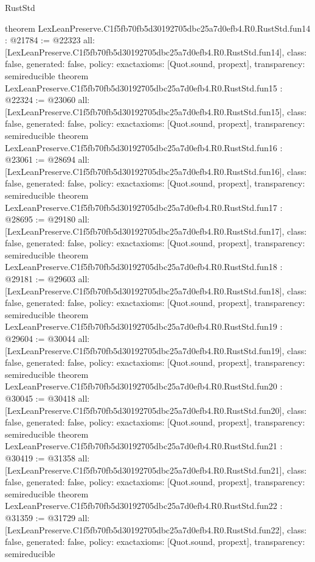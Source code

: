 \begin{lexlean}{RustStd}
\begin{coremodule}
{}
theorem LexLeanPreserve.C1f5fb70fb5d30192705dbc25a7d0efb4.R0.RustStd.fun14 : @21784 := @22323 {
  all: [LexLeanPreserve.C1f5fb70fb5d30192705dbc25a7d0efb4.R0.RustStd.fun14],
  class: false,
  generated: false,
  policy: exact{axioms: [Quot.sound, propext]},
  transparency: semireducible
}
theorem LexLeanPreserve.C1f5fb70fb5d30192705dbc25a7d0efb4.R0.RustStd.fun15 : @22324 := @23060 {
  all: [LexLeanPreserve.C1f5fb70fb5d30192705dbc25a7d0efb4.R0.RustStd.fun15],
  class: false,
  generated: false,
  policy: exact{axioms: [Quot.sound, propext]},
  transparency: semireducible
}
theorem LexLeanPreserve.C1f5fb70fb5d30192705dbc25a7d0efb4.R0.RustStd.fun16 : @23061 := @28694 {
  all: [LexLeanPreserve.C1f5fb70fb5d30192705dbc25a7d0efb4.R0.RustStd.fun16],
  class: false,
  generated: false,
  policy: exact{axioms: [Quot.sound, propext]},
  transparency: semireducible
}
theorem LexLeanPreserve.C1f5fb70fb5d30192705dbc25a7d0efb4.R0.RustStd.fun17 : @28695 := @29180 {
  all: [LexLeanPreserve.C1f5fb70fb5d30192705dbc25a7d0efb4.R0.RustStd.fun17],
  class: false,
  generated: false,
  policy: exact{axioms: [Quot.sound, propext]},
  transparency: semireducible
}
theorem LexLeanPreserve.C1f5fb70fb5d30192705dbc25a7d0efb4.R0.RustStd.fun18 : @29181 := @29603 {
  all: [LexLeanPreserve.C1f5fb70fb5d30192705dbc25a7d0efb4.R0.RustStd.fun18],
  class: false,
  generated: false,
  policy: exact{axioms: [Quot.sound, propext]},
  transparency: semireducible
}
theorem LexLeanPreserve.C1f5fb70fb5d30192705dbc25a7d0efb4.R0.RustStd.fun19 : @29604 := @30044 {
  all: [LexLeanPreserve.C1f5fb70fb5d30192705dbc25a7d0efb4.R0.RustStd.fun19],
  class: false,
  generated: false,
  policy: exact{axioms: [Quot.sound, propext]},
  transparency: semireducible
}
theorem LexLeanPreserve.C1f5fb70fb5d30192705dbc25a7d0efb4.R0.RustStd.fun20 : @30045 := @30418 {
  all: [LexLeanPreserve.C1f5fb70fb5d30192705dbc25a7d0efb4.R0.RustStd.fun20],
  class: false,
  generated: false,
  policy: exact{axioms: [Quot.sound, propext]},
  transparency: semireducible
}
theorem LexLeanPreserve.C1f5fb70fb5d30192705dbc25a7d0efb4.R0.RustStd.fun21 : @30419 := @31358 {
  all: [LexLeanPreserve.C1f5fb70fb5d30192705dbc25a7d0efb4.R0.RustStd.fun21],
  class: false,
  generated: false,
  policy: exact{axioms: [Quot.sound, propext]},
  transparency: semireducible
}
theorem LexLeanPreserve.C1f5fb70fb5d30192705dbc25a7d0efb4.R0.RustStd.fun22 : @31359 := @31729 {
  all: [LexLeanPreserve.C1f5fb70fb5d30192705dbc25a7d0efb4.R0.RustStd.fun22],
  class: false,
  generated: false,
  policy: exact{axioms: [Quot.sound, propext]},
  transparency: semireducible
}
\end{coremodule}
\end{lexlean}
